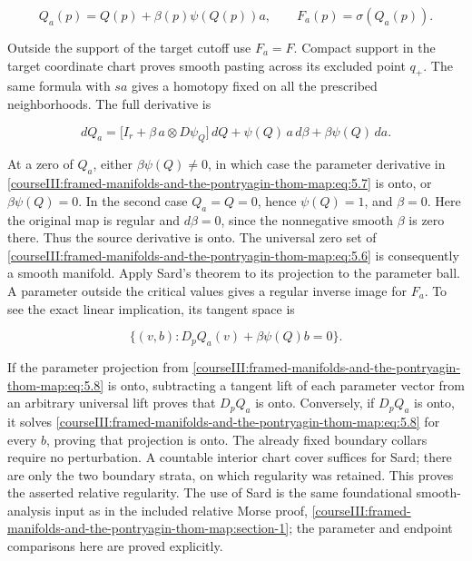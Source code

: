 \begin{equation}
Q_a(p)=Q(p)+\beta(p)\psi(Q(p))a,\qquad
 F_a(p)=\sigma(Q_a(p)).
 \label{courseIII:framed-manifolds-and-the-pontryagin-thom-map:eq:5.6}
\end{equation}

Outside the support of the target cutoff use \(F_a=F\). Compact support in the target coordinate chart proves smooth pasting across its excluded point \(q_+\). The same formula with \(sa\) gives a homotopy fixed on all the prescribed neighborhoods. The full derivative is

\begin{equation}
dQ_a=
 \bigl[I_r+\beta\,a\otimes D\psi_Q\bigr]\,dQ
       +\psi(Q)\,a\,d\beta+\beta\psi(Q)\,da.
 \label{courseIII:framed-manifolds-and-the-pontryagin-thom-map:eq:5.7}
\end{equation}

At a zero of \(Q_a\), either \(\beta\psi(Q)\ne0\), in which case the parameter derivative in \eqref{courseIII:framed-manifolds-and-the-pontryagin-thom-map:eq:5.7} is onto, or \(\beta\psi(Q)=0\). In the second case \(Q_a=Q=0\), hence \(\psi(Q)=1\), and \(\beta=0\). Here the original map is regular and \(d\beta=0\), since the nonnegative smooth \(\beta\) is zero there. Thus the source derivative is onto. The universal zero set of \eqref{courseIII:framed-manifolds-and-the-pontryagin-thom-map:eq:5.6} is consequently a smooth manifold. Apply Sard's theorem to its projection to the parameter ball. A parameter outside the critical values gives a regular inverse image for \(F_a\). To see the exact linear implication, its tangent space is

\begin{equation}
\{(v,b):D_pQ_a(v)+\beta\psi(Q)b=0\}.
 \label{courseIII:framed-manifolds-and-the-pontryagin-thom-map:eq:5.8}
\end{equation}

If the parameter projection from \eqref{courseIII:framed-manifolds-and-the-pontryagin-thom-map:eq:5.8} is onto, subtracting a tangent lift of each parameter vector from an arbitrary universal lift proves that \(D_pQ_a\) is onto. Conversely, if \(D_pQ_a\) is onto, it solves \eqref{courseIII:framed-manifolds-and-the-pontryagin-thom-map:eq:5.8} for every \(b\), proving that projection is onto. The already fixed boundary collars require no perturbation. A countable interior chart cover suffices for Sard; there are only the two boundary strata, on which regularity was retained. This proves the asserted relative regularity. The use of Sard is the same foundational smooth-analysis input as in the included relative Morse proof, \cref{courseIII:framed-manifolds-and-the-pontryagin-thom-map:section-1}; the parameter and endpoint comparisons here are proved explicitly.

